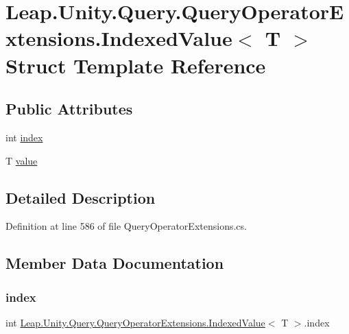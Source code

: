 \hypertarget{struct_leap_1_1_unity_1_1_query_1_1_query_operator_extensions_1_1_indexed_value}{}\section{Leap.\+Unity.\+Query.\+Query\+Operator\+Extensions.\+Indexed\+Value$<$ T $>$ Struct Template Reference}
\label{struct_leap_1_1_unity_1_1_query_1_1_query_operator_extensions_1_1_indexed_value}
\subsection*{Public Attributes}
\begin{DoxyCompactItemize}
\item 
int \mbox{\hyperlink{struct_leap_1_1_unity_1_1_query_1_1_query_operator_extensions_1_1_indexed_value_a1facfab341d18708629c2071d2c105ea}{index}}
\item 
T \mbox{\hyperlink{struct_leap_1_1_unity_1_1_query_1_1_query_operator_extensions_1_1_indexed_value_a004f3cc90fa8d564bf5d1fb2f0124fc0}{value}}
\end{DoxyCompactItemize}


\subsection{Detailed Description}


Definition at line 586 of file Query\+Operator\+Extensions.\+cs.



\subsection{Member Data Documentation}
\mbox{\label{struct_leap_1_1_unity_1_1_query_1_1_query_operator_extensions_1_1_indexed_value_a1facfab341d18708629c2071d2c105ea}} 
\subsubsection{\texorpdfstring{index}{index}}
{\footnotesize\ttfamily int \mbox{\hyperlink{struct_leap_1_1_unity_1_1_query_1_1_query_operator_extensions_1_1_indexed_value}{Leap.\+Unity.\+Query.\+Query\+Operator\+Extensions.\+Indexed\+Value}}$<$ T $>$.index}




